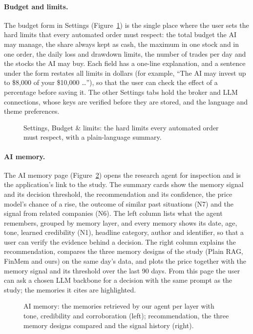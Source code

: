 \paragraph{Budget and limits.} The budget form in Settings (Figure~\ref{fig:ui-budget}) is the single place where the user sets the hard limits that every automated order must respect: the total budget the AI may manage, the share always kept as cash, the maximum in one stock and in one order, the daily loss and drawdown limits, the number of trades per day and the stocks the AI may buy. Each field has a one-line explanation, and a sentence under the form restates all limits in dollars (for example, ``The AI may invest up to \$8{,}000 of your \$10{,}000 \ldots''), so that the user can check the effect of a percentage before saving it. The other Settings tabs hold the broker and LLM connections, whose keys are verified before they are stored, and the language and theme preferences.
\begin{figure}[!htbp]
\centering
{}
\caption{Settings, Budget \& limits: the hard limits every automated order must respect, with a plain-language summary.}
\label{fig:ui-budget}
\end{figure}

\paragraph{AI memory.} The AI memory page (Figure~\ref{fig:ui-agent}) opens the research agent for inspection and is the application's link to the study. The summary cards show the memory signal and its decision threshold, the recommendation and its confidence, the price model's chance of a rise, the outcome of similar past situations (N7) and the signal from related companies (N6). The left column lists what the agent remembers, grouped by memory layer, and every memory shows its date, age, tone, learned credibility (N1), headline category, author and identifier, so that a user can verify the evidence behind a decision. The right column explains the recommendation, compares the three memory designs of the study (Plain RAG, FinMem and ours) on the same day's data, and plots the price together with the memory signal and its threshold over the last 90 days. From this page the user can ask a chosen LLM backbone for a decision with the same prompt as the study; the memories it cites are highlighted.
\begin{figure}[!htbp]
\centering
{}
\caption{AI memory: the memories retrieved by our agent per layer with tone, credibility and corroboration (left); recommendation, the three memory designs compared and the signal history (right).}
\label{fig:ui-agent}
\end{figure}

